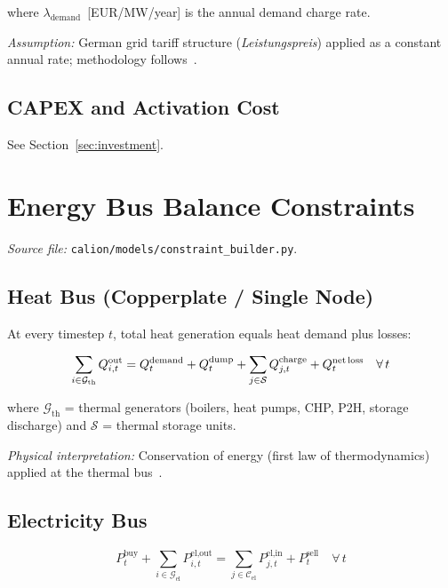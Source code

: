 \documentclass[a4paper,12pt]{article}
\begin{document}
where $\lambda_{\text{demand}}$~[EUR/MW/year] is the annual demand charge rate.

\noindent\textit{Assumption:} German grid tariff structure (\emph{Leistungspreis}) applied as
a constant annual rate; methodology follows~\cite{BNetzA2023}.

\subsection{CAPEX and Activation Cost}

See Section~\ref{sec:investment}.

\section{Energy Bus Balance Constraints}
\label{sec:bus}

\textit{Source file:} \texttt{calion/models/constraint\_builder.py}.

\subsection{Heat Bus (Copperplate / Single Node)}

At every timestep $t$, total heat generation equals heat demand plus losses:

\begin{equation}
  \sum_{i \in \mathcal{G}_{\text{th}}} Q^{\text{out}}_{i,t}
  = Q^{\text{demand}}_{t} + Q^{\text{dump}}_{t}
    + \sum_{j \in \mathcal{S}} Q^{\text{charge}}_{j,t}
    + Q^{\text{net\,loss}}_{t}
  \quad \forall\, t
  \label{eq:heat-bus}
\end{equation}

where $\mathcal{G}_{\text{th}}$ = thermal generators (boilers, heat pumps, CHP, P2H, storage
discharge) and $\mathcal{S}$ = thermal storage units.

\noindent\textit{Physical interpretation:} Conservation of energy (first law of thermodynamics)
applied at the thermal bus~\cite{Lund2014}.

\subsection{Electricity Bus}

\begin{equation}
  P^{\text{buy}}_{t} + \sum_{i \in \mathcal{G}_{\text{el}}} P^{\text{el,out}}_{i,t}
  = \sum_{j \in \mathcal{C}_{\text{el}}} P^{\text{el,in}}_{j,t} + P^{\text{sell}}_{t}
  \quad \forall\, t
  \label{eq:el-bus}
\end{equation}
\end{document}
